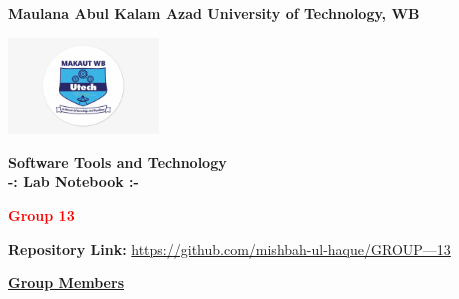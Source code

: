 \documentclass[a4paper,12pt]{article}
\begin{document}
\begin{titlepage}
    \centering
    \vspace*{0 cm}
    \Large
    \textbf{Maulana Abul Kalam Azad University of Technology, WB}
    \vspace{0.5cm}
    
    \includegraphics[width=0.3\textwidth]{306-3063564_maulana-abul-kalam-azad-university-logo.png} %
    \vspace{0.5cm}
    
    \LARGE
    \textbf{\textcolor{blue!60}{Software Tools and Technology\\
        -: Lab Notebook :-}}
    \vspace{0.5cm}
    
    \large
    \textbf{\textcolor{red}{Group 13}}
    \vspace{1 cm}
    
    \textbf{Repository Link:} \href{https://github.com/mishbah-ul-haque/GROUP---13}{https://github.com/mishbah-ul-haque/GROUP---13}
    \vspace{1cm}
    
    \textbf{\underline{\textcolor{blue!60}{Group Members}}}
    \vspace{0.5cm}


\end{titlepage}
\end{document}
